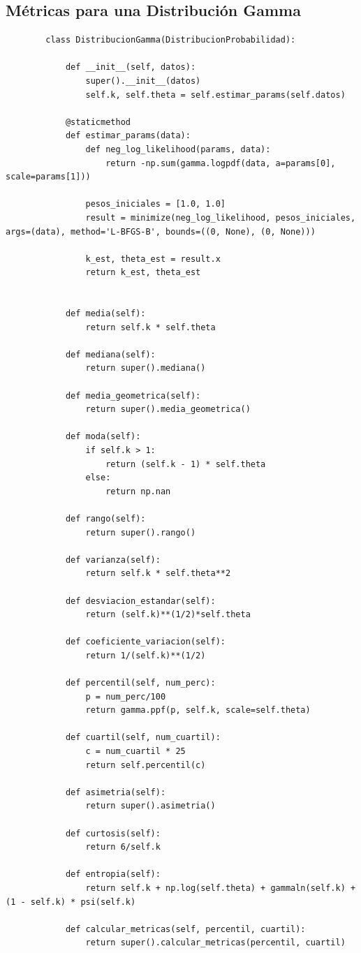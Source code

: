 \documentclass[11pt]{article} %
\begin{document}
	\subsection{Métricas para una Distribución Gamma}
	\begin{lstlisting}
		class DistribucionGamma(DistribucionProbabilidad):
		
			def __init__(self, datos):
				super().__init__(datos)
				self.k, self.theta = self.estimar_params(self.datos)
			
			@staticmethod
			def estimar_params(data):
				def neg_log_likelihood(params, data):
					return -np.sum(gamma.logpdf(data, a=params[0], scale=params[1]))
				
				pesos_iniciales = [1.0, 1.0]
				result = minimize(neg_log_likelihood, pesos_iniciales, args=(data), method='L-BFGS-B', bounds=((0, None), (0, None)))
				
				k_est, theta_est = result.x
				return k_est, theta_est
			
			
			def media(self):
				return self.k * self.theta
			
			def mediana(self):
				return super().mediana()
			
			def media_geometrica(self):
				return super().media_geometrica()
			
			def moda(self):
				if self.k > 1:
					return (self.k - 1) * self.theta
				else:
					return np.nan
			
			def rango(self):
				return super().rango()
			
			def varianza(self):
				return self.k * self.theta**2
			
			def desviacion_estandar(self):
				return (self.k)**(1/2)*self.theta
			
			def coeficiente_variacion(self):
				return 1/(self.k)**(1/2)
			
			def percentil(self, num_perc):
				p = num_perc/100
				return gamma.ppf(p, self.k, scale=self.theta)
			
			def cuartil(self, num_cuartil):
				c = num_cuartil * 25
				return self.percentil(c)
			
			def asimetria(self):
				return super().asimetria()
			
			def curtosis(self):
				return 6/self.k
			
			def entropia(self):
				return self.k + np.log(self.theta) + gammaln(self.k) + (1 - self.k) * psi(self.k)
			
			def calcular_metricas(self, percentil, cuartil):
				return super().calcular_metricas(percentil, cuartil)
	\end{lstlisting}
	
\end{document}

